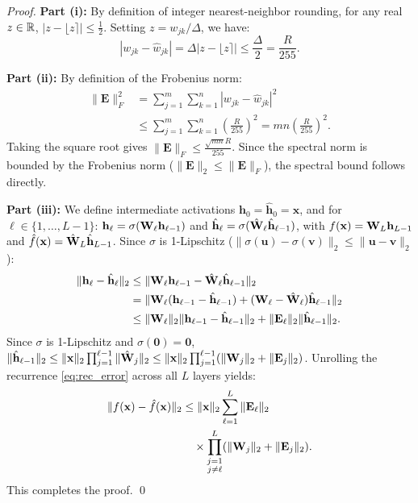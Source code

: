 \begin{proof}
\textbf{Part (i):} By definition of integer nearest-neighbor rounding, for any real $z \in \mathbb{R}$, $|z - \lfloor z \rceil| \leq \frac{1}{2}$.
Setting $z = w_{jk} / \Delta$, we have:
\begin{equation}
  |w_{jk} - \hat{w}_{jk}| = \Delta |z - \lfloor z \rceil| \leq \frac{\Delta}{2} = \frac{R}{255}.
\end{equation}

\textbf{Part (ii):} By definition of the Frobenius norm:
\begin{align}
  \|\mathbf{E}\|_F^2
  &= \sum_{j=1}^m \sum_{k=1}^n |w_{jk} - \hat{w}_{jk}|^2 \nonumber\\
  &\leq \sum_{j=1}^m \sum_{k=1}^n \left(\frac{R}{255}\right)^2 = mn \left(\frac{R}{255}\right)^2.
\end{align}
Taking the square root gives $\|\mathbf{E}\|_F \leq \frac{\sqrt{mn} R}{255}$.
Since the spectral norm is bounded by the Frobenius norm ($\|\mathbf{E}\|_2 \leq \|\mathbf{E}\|_F$), the spectral bound follows directly.

\textbf{Part (iii):} We define intermediate activations $\mathbf{h}_0 = \hat{\mathbf{h}}_0 = \mathbf{x}$, and for $\ell \in \{1, \ldots, L-1\}$:
$\mathbf{h}_\ell = \sigma(\mathbf{W}_\ell \mathbf{h}_{\ell-1})$ and $\hat{\mathbf{h}}_\ell = \sigma(\hat{\mathbf{W}}_\ell \hat{\mathbf{h}}_{\ell-1})$, with $f(\mathbf{x}) = \mathbf{W}_L \mathbf{h}_{L-1}$ and $\hat{f}(\mathbf{x}) = \hat{\mathbf{W}}_L \hat{\mathbf{h}}_{L-1}$.
Since $\sigma$ is 1-Lipschitz ($\|\sigma(\mathbf{u}) - \sigma(\mathbf{v})\|_2 \leq \|\mathbf{u} - \mathbf{v}\|_2$):
\begin{align}
  \|\mathbf{h}_\ell - \hat{\mathbf{h}}_\ell\|_2
  &\leq \|\mathbf{W}_\ell \mathbf{h}_{\ell-1} - \hat{\mathbf{W}}_\ell \hat{\mathbf{h}}_{\ell-1}\|_2 \nonumber\\
  &= \|\mathbf{W}_\ell(\mathbf{h}_{\ell-1} - \hat{\mathbf{h}}_{\ell-1}) + (\mathbf{W}_\ell - \hat{\mathbf{W}}_\ell)\hat{\mathbf{h}}_{\ell-1}\|_2 \nonumber\\
  &\leq \|\mathbf{W}_\ell\|_2 \|\mathbf{h}_{\ell-1} - \hat{\mathbf{h}}_{\ell-1}\|_2 + \|\mathbf{E}_\ell\|_2 \|\hat{\mathbf{h}}_{\ell-1}\|_2.
  \label{eq:rec_error}
\end{align}
Since $\sigma$ is 1-Lipschitz and $\sigma(\mathbf{0})=\mathbf{0}$, $\|\hat{\mathbf{h}}_{\ell-1}\|_2 \leq \|\mathbf{x}\|_2 \prod_{j=1}^{\ell-1} \|\hat{\mathbf{W}}_j\|_2 \leq \|\mathbf{x}\|_2 \prod_{j=1}^{\ell-1} (\|\mathbf{W}_j\|_2 + \|\mathbf{E}_j\|_2)$.
Unrolling the recurrence \eqref{eq:rec_error} across all $L$ layers yields:
\begin{align}
  \|f(\mathbf{x}) - \hat{f}(\mathbf{x})\|_2
  &\leq \|\mathbf{x}\|_2 \sum_{\ell=1}^L \|\mathbf{E}_\ell\|_2 \nonumber\\
  &\quad \times \prod_{\substack{j=1 \\ j \neq \ell}}^L (\|\mathbf{W}_j\|_2 + \|\mathbf{E}_j\|_2).
\end{align}
This completes the proof. \qed
\end{proof}


